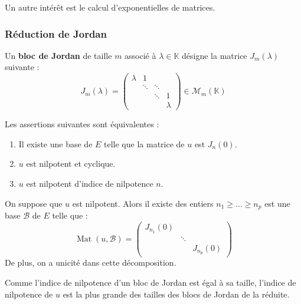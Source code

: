 	\begin{remark}
		Un autre intérêt est le calcul d'exponentielles de matrices.
	\end{remark}

	\subsubsection{Réduction de Jordan}


	\begin{definition}
		Un \textbf{bloc de Jordan} de taille $m$ associé à $\lambda \in \mathbb{K}$ désigne la matrice $J_m(\lambda)$ suivante :
		\[ J_m(\lambda) = \begin{pmatrix} \lambda & 1 & \\ & \ddots & \ddots & \\ & & \ddots & 1 \\ & & & \lambda \end{pmatrix} \in \mathcal{M}_m(\mathbb{K}) \]
	\end{definition}

	\begin{proposition}
		Les assertions suivantes sont équivalentes :
		\begin{enumerate}[label=(\roman*)]
			\item Il existe une base de $E$ telle que la matrice de $u$ est $J_n(0)$.
			\item $u$ est nilpotent et cyclique.
			\item $u$ est nilpotent d'indice de nilpotence $n$.
		\end{enumerate}
	\end{proposition}

	\begin{theorem}
		On suppose que $u$ est nilpotent. Alors il existe des entiers $n_1 \geq \dots \geq n_p$ est une base $\mathcal{B}$ de $E$ telle que :
		\[ \operatorname{Mat}(u, \mathcal{B}) = \begin{pmatrix} J_{n_1}(0) & & \\ & \ddots & \\ & & J_{n_p}(0) \end{pmatrix} \]
		De plus, on a unicité dans cette décomposition.
	\end{theorem}

	\begin{remark}
		Comme l'indice de nilpotence d'un bloc de Jordan est égal à sa taille, l'indice de nilpotence de $u$ est la plus grande des tailles des blocs de Jordan de la réduite.
	\end{remark}

